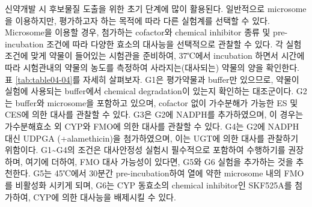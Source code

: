 \documentclass[
  11pt,
  krantz2, a4paper, twoside]{krantz}
\begin{document}
신약개발 시 후보물질 도출을 위한 초기 단계에 많이 활용된다. 일반적으로
microsome을 이용하지만, 평가하고자 하는 목적에 따라 다른 실험계를 선택할
수 있다. Microsome을 이용할 경우, 첨가하는 cofactor와 chemical inhibitor
종류 및 pre-incubation 조건에 따라 다양한 효소의 대사능을 선택적으로
관찰할 수 있다. 각 실험 조건에 맞게 약물이 들어있는 시험관을 준비하여,
37℃에서 incubation 하면서 시간에 따라 시험관내의 약물의 농도를 측정하여
사라지는(대사되는) 약물의 양을 확인한다. 표 \ref{tab:table04-04}를 자세히
살펴보자. G1은 평가약물과 buffer만 있으므로, 약물이 실험에 사용되는
buffer에서 chemical degradation이 있는지 확인하는 대조군이다. G2는
buffer와 microsome을 포함하고 있으며, cofactor 없이 가수분해가 가능한 ES
및 CES에 의한 대사를 관찰할 수 있다. G3은 G2에 NADPH를 추가하였으며, 이
경우는 가수분해효소 외 CYP와 FMO에 의한 대사를 관찰할 수 있다. G4는 G2에
NADPH 대신 UDPGA (+alamethicin)을 첨가하였으며, 이는 UGT에 의한 대사를
관찰하기 위함이다. G1\textasciitilde G4의 조건은 대사안정성 실험시 필수적으로 포함하여
수행하기를 권장하며, 여기에 더하여, FMO 대사 가능성이 있다면, G5와 G6
실험을 추가하는 것을 추천한다. G5는 45℃에서 30분간 pre-incubation하여
열에 약한 microsome 내의 FMO를 비활성화 시키게 되며, G6는 CYP 동효소의
chemical inhibitor인 SKF525A를 첨가하여, CYP에 의한 대사능을 배제시킬 수
있다.
\end{document}
